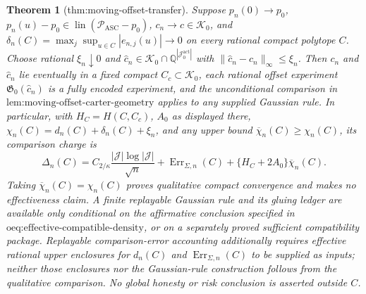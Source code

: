 \documentclass{article}
\newtheorem{theorem}{Theorem}
\begin{document}
\begin{theorem}[thm:moving-offset-transfer]\label{thm:moving-offset-transfer}
Suppose \(p_n(0)\to p_0\), \(p_n(u)-p_0\in\operatorname{lin}(\mathcal P_{\mathrm{ASC}}-p_0)\), \(c_n\to c\in\mathcal K_0\), and \(\delta_n(C)=\max_j\sup_{u\in C}|e_{n,j}(u)|\to0\) on every rational compact polytope \(C\).  Choose rational \(\xi_n\downarrow0\) and \(\widehat c_n\in\mathcal K_0\cap\mathbb Q^{|\mathcal J_0^{\mathrm{act}}|}\) with \(\|\widehat c_n-c_n\|_\infty\le\xi_n\).  Then \(c_n\) and \(\widehat c_n\) lie eventually in a fixed compact \(C_c\subset\mathcal K_0\), each rational offset experiment \(\mathfrak G_0(\widehat c_n)\) is a fully encoded experiment, and the unconditional comparison in \(\text{lem:moving-offset-carter-geometry}\) applies to any supplied Gaussian rule.  In particular, with \(H_C=H(C,C_c)\), \(A_0\) as displayed there, \(\chi_n(C)=d_n(C)+\delta_n(C)+\xi_n\), and any upper bound \(\overline\chi_n(C)\ge\chi_n(C)\), its comparison charge is
\[
\Delta_n(C)=C_{2/\kappa}\frac{|\mathcal J|\log|\mathcal J|}{\sqrt n}
+\operatorname{Err}_{\Sigma,n}(C)
+\{H_C+2A_0\}\overline\chi_n(C).
\]
Taking \(\overline\chi_n(C)=\chi_n(C)\) proves qualitative compact convergence and makes no effectiveness claim.  A finite replayable Gaussian rule and its gluing ledger are available only conditional on the affirmative conclusion specified in \(\text{oeq:effective-compatible-density}\), or on a separately proved sufficient compatibility package.  Replayable comparison-error accounting additionally requires effective rational upper enclosures for \(d_n(C)\) and \(\operatorname{Err}_{\Sigma,n}(C)\) to be supplied as inputs; neither those enclosures nor the Gaussian-rule construction follows from the qualitative comparison.  No global honesty or risk conclusion is asserted outside \(C\).
\end{theorem}
\end{document}
